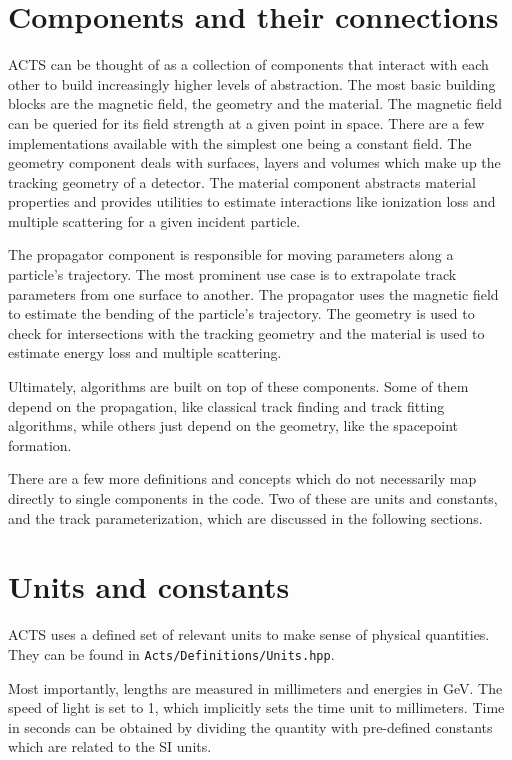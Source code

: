 \section{Components and their connections}

ACTS can be thought of as a collection of components that interact with each other to build increasingly higher levels of abstraction. The most basic building blocks are the magnetic field, the geometry and the material. The magnetic field can be queried for its field strength at a given point in space. There are a few implementations available with the simplest one being a constant field. The geometry component deals with surfaces, layers and volumes which make up the tracking geometry of a detector. The material component abstracts material properties and provides utilities to estimate interactions like ionization loss and multiple scattering for a given incident particle.

The propagator component is responsible for moving parameters along a particle's trajectory. The most prominent use case is to extrapolate track parameters from one surface to another. The propagator uses the magnetic field to estimate the bending of the particle's trajectory. The geometry is used to check for intersections with the tracking geometry and the material is used to estimate energy loss and multiple scattering.

Ultimately, algorithms are built on top of these components. Some of them depend on the propagation, like classical track finding and track fitting algorithms, while others just depend on the geometry, like the spacepoint formation.

There are a few more definitions and concepts which do not necessarily map directly to single components in the code. Two of these are units and constants, and the track parameterization, which are discussed in the following sections.

\section{Units and constants}

ACTS uses a defined set of relevant units to make sense of physical quantities. They can be found in \texttt{Acts/Definitions/Units.hpp}.

Most importantly, lengths are measured in millimeters and energies in GeV. The speed of light is set to 1, which implicitly sets the time unit to millimeters. Time in seconds can be obtained by dividing the quantity with pre-defined constants which are related to the SI units.

